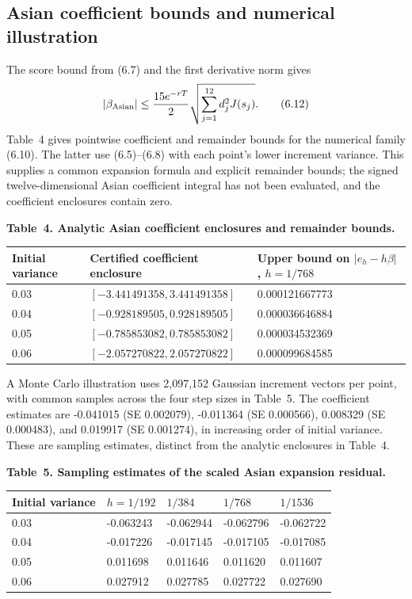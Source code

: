 \subsection{Asian coefficient bounds and numerical illustration}

The score bound from (6.7) and the first derivative norm gives
\[
|\beta_{\rm Asian}|
\le {15e^{-rT}\over2}\sqrt{\sum_{j=1}^{12}d_j^2J(s_j)}.
\tag{6.12}
\]
Table~4 gives pointwise coefficient and remainder bounds for the numerical
family (6.10). The latter use (6.5)--(6.8) with each point's lower increment
variance. This supplies a common expansion formula and explicit remainder
bounds; the signed twelve-dimensional Asian coefficient integral has not been
evaluated, and the coefficient enclosures contain zero.

\noindent\textbf{Table~4. Analytic Asian coefficient enclosures and remainder bounds.}
\begin{center}
\begin{tabularx}{\textwidth}{@{}l X X@{}}
\toprule
Initial variance & Certified coefficient enclosure & Upper bound on \(|e_h-h\beta|\), \(h=1/768\) \\
\midrule
0.03 & \([-3.441491358,3.441491358]\) & 0.000121667773 \\
0.04 & \([-0.928189505,0.928189505]\) & 0.000036646884 \\
0.05 & \([-0.785853082,0.785853082]\) & 0.000034532369 \\
0.06 & \([-2.057270822,2.057270822]\) & 0.000099684585 \\
\bottomrule
\end{tabularx}
\end{center}

A Monte Carlo illustration uses 2,097,152 Gaussian increment vectors per point,
with common samples across the four step sizes in Table~5. The coefficient
estimates are -0.041015 (SE 0.002079), -0.011364 (SE 0.000566),
0.008329 (SE 0.000483), and 0.019917 (SE 0.001274), in increasing order of
initial variance. These are sampling estimates, distinct from the analytic
enclosures in Table~4.

\noindent\textbf{Table~5. Sampling estimates of the scaled Asian expansion residual.}
\begin{center}
\begin{tabularx}{\textwidth}{@{}l X X X X@{}}
\toprule
Initial variance & \(h=1/192\) & \(1/384\) & \(1/768\) & \(1/1536\) \\
\midrule
0.03 & -0.063243 & -0.062944 & -0.062796 & -0.062722 \\
0.04 & -0.017226 & -0.017145 & -0.017105 & -0.017085 \\
0.05 & 0.011698 & 0.011646 & 0.011620 & 0.011607 \\
0.06 & 0.027912 & 0.027785 & 0.027722 & 0.027690 \\
\bottomrule
\end{tabularx}
\end{center}


